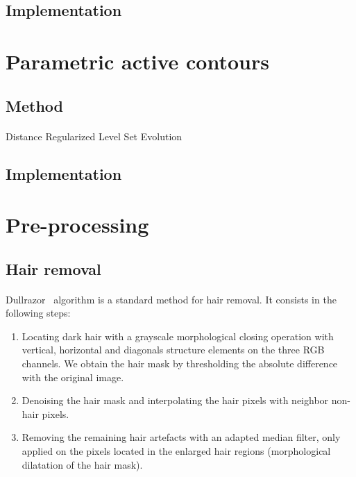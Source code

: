 \documentclass[a4paper,10pt]{article}
\begin{document}
\subsection{Implementation}

\section{Parametric active contours}
\subsection{Method}
\paragraph{}  Distance Regularized Level Set Evolution \cite{li2010distance} 
\subsection{Implementation}

\section{Pre-processing}
\subsection{Hair removal}
\paragraph{} Dullrazor~\cite{Dullrazor1997} algorithm is a standard method for 
hair removal. It consists in the following steps:
\begin{enumerate}
 \item Locating dark hair with a grayscale morphological closing operation with 
vertical, horizontal and diagonals structure elements on the three RGB channels. 
We obtain the hair mask by thresholding the absolute difference with the 
original image.
 \item Denoising the hair mask and interpolating the hair pixels with neighbor 
non-hair pixels. 
 \item Removing the remaining hair artefacts with an adapted median filter, only 
applied on the pixels located in the enlarged hair regions
 (morphological dilatation of the hair mask).
\end{enumerate}





\end{document}
